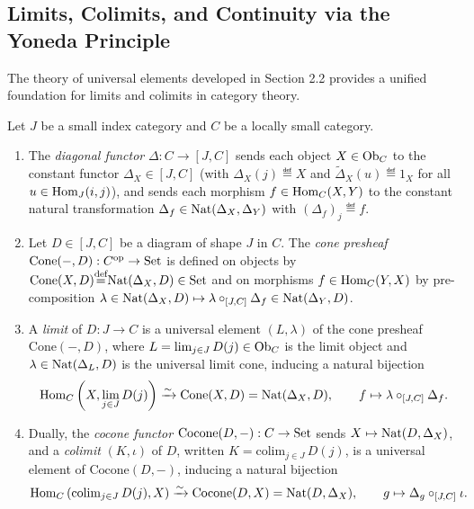 \documentclass[10pt,a4paper]{article}
\begin{document}
\subsection{Limits, Colimits, and Continuity via the Yoneda Principle}
The theory of universal elements developed in Section 2.2 provides a unified foundation for limits and colimits in category theory.

\begin{definition}\label{def:limits}
Let $J$ be a small index category and $C$ be a locally small category.
\begin{enumerate}
\item The \emph{diagonal functor} $\Delta : C \to [J, C]$ sends each object $X \in {\textrm{Ob}}_C$ to the constant functor $\Delta_X \in [J, C]$ (with $\Delta_X(j) \eqdef X$ and $\widetilde{\Delta}_X(u) \eqdef 1_X$ for all $u \in {\textrm{Hom}}_J(i, j)$), and sends each morphism $f \in {\textrm{Hom}}_C(X, Y)$ to the constant natural transformation $\Delta_f \in {\textrm{Nat}}(\Delta_X, \Delta_Y)$ with $(\Delta_f)_j \eqdef f$.
\item Let $D \in [J, C]$ be a diagram of shape $J$ in $C$. The \emph{cone presheaf} $\mathrm{Cone}(-, D) : C^{\textrm{op}} \to {\textrm{Set}}$ is defined on objects by $\mathrm{Cone}(X, D) {\stackrel{{\textrm{def}}}{=}} {\textrm{Nat}}(\Delta_X, D) \in {\textrm{Set}}$ and on morphisms $f \in {\textrm{Hom}}_C(Y, X)$ by pre-composition $\lambda \in {\textrm{Nat}}(\Delta_X, D) \mapsto \lambda \circ_{[J,C]} \Delta_f \in {\textrm{Nat}}(\Delta_Y, D)$.
\item A \emph{limit} of $D : J \to C$ is a universal element $(L, \lambda)$ of the cone presheaf $\mathrm{Cone}(-, D)$, where $L = \lim_{j \in J} D(j) \in {\textrm{Ob}}_C$ is the limit object and $\lambda \in {\textrm{Nat}}(\Delta_L, D)$ is the universal limit cone, inducing a natural bijection
$${\textrm{Hom}}_C\left(X, \lim_{j \in J} D(j)\right) \xrightarrow{\sim} \mathrm{Cone}(X, D) = {\textrm{Nat}}(\Delta_X, D), \qquad f \mapsto \lambda \circ_{[J,C]} \Delta_f.$$
\item Dually, the \emph{cocone functor} $\mathrm{Cocone}(D, -) : C \to {\textrm{Set}}$ sends $X \mapsto {\textrm{Nat}}(D, \Delta_X)$, and a \emph{colimit} $(K, \iota)$ of $D$, written $K = \mathrm{colim}_{j \in J}\, D(j)$, is a universal element of $\mathrm{Cocone}(D, -)$, inducing a natural bijection
$${\textrm{Hom}}_C\left(\mathrm{colim}_{j \in J}\, D(j), X\right) \xrightarrow{\sim} \mathrm{Cocone}(D, X) = {\textrm{Nat}}(D, \Delta_X), \qquad g \mapsto \Delta_g \circ_{[J,C]} \iota.$$
\end{enumerate}
\end{definition}
\end{document}
